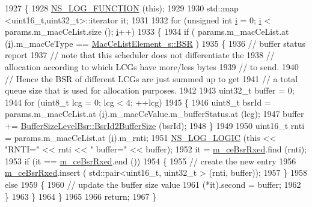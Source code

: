 \begin{DoxyCode}
1927 \{
1928   \hyperlink{log-macros-disabled_8h_a90b90d5bad1f39cb1b64923ea94c0761}{NS\_LOG\_FUNCTION} (\textcolor{keyword}{this});
1929 
1930   std::map <uint16\_t,uint32\_t>::iterator it;
1931 
1932   \textcolor{keywordflow}{for} (\textcolor{keywordtype}{unsigned} \textcolor{keywordtype}{int} \hyperlink{bernuolliDistribution_8m_a6f6ccfcf58b31cb6412107d9d5281426}{i} = 0; \hyperlink{bernuolliDistribution_8m_a6f6ccfcf58b31cb6412107d9d5281426}{i} < params.m\_macCeList.size (); \hyperlink{bernuolliDistribution_8m_a6f6ccfcf58b31cb6412107d9d5281426}{i}++)
1933     \{
1934       \textcolor{keywordflow}{if} ( params.m\_macCeList.at (\hyperlink{bernuolliDistribution_8m_a6f6ccfcf58b31cb6412107d9d5281426}{i}).m\_macCeType == \hyperlink{structns3_1_1MacCeListElement__s_a270a6526dfc7da02e9dc91823c290f6bac50796b01160b1825ec34efa1ad9f051}{MacCeListElement\_s::BSR} )
1935         \{
1936           \textcolor{comment}{// buffer status report}
1937           \textcolor{comment}{// note that this scheduler does not differentiate the}
1938           \textcolor{comment}{// allocation according to which LCGs have more/less bytes}
1939           \textcolor{comment}{// to send.}
1940           \textcolor{comment}{// Hence the BSR of different LCGs are just summed up to get}
1941           \textcolor{comment}{// a total queue size that is used for allocation purposes.}
1942 
1943           uint32\_t buffer = 0;
1944           \textcolor{keywordflow}{for} (uint8\_t lcg = 0; lcg < 4; ++lcg)
1945             \{
1946               uint8\_t bsrId = params.m\_macCeList.at (\hyperlink{bernuolliDistribution_8m_a6f6ccfcf58b31cb6412107d9d5281426}{i}).m\_macCeValue.m\_bufferStatus.at (lcg);
1947               buffer += \hyperlink{classns3_1_1BufferSizeLevelBsr_a67fc905f267ed8ac5a617fe229699122}{BufferSizeLevelBsr::BsrId2BufferSize} (bsrId);
1948             \}
1949 
1950           uint16\_t rnti = params.m\_macCeList.at (\hyperlink{bernuolliDistribution_8m_a6f6ccfcf58b31cb6412107d9d5281426}{i}).m\_rnti;
1951           \hyperlink{group__logging_ga88acd260151caf2db9c0fc84997f45ce}{NS\_LOG\_LOGIC} (\textcolor{keyword}{this} << \textcolor{stringliteral}{"RNTI="} << rnti << \textcolor{stringliteral}{" buffer="} << buffer);
1952           it = \hyperlink{classns3_1_1PfFfMacScheduler_a9d4cd2380a8e04f1e7d69ac67628b9cc}{m\_ceBsrRxed}.find (rnti);
1953           \textcolor{keywordflow}{if} (it == \hyperlink{classns3_1_1PfFfMacScheduler_a9d4cd2380a8e04f1e7d69ac67628b9cc}{m\_ceBsrRxed}.end ())
1954             \{
1955               \textcolor{comment}{// create the new entry}
1956               \hyperlink{classns3_1_1PfFfMacScheduler_a9d4cd2380a8e04f1e7d69ac67628b9cc}{m\_ceBsrRxed}.insert ( std::pair<uint16\_t, uint32\_t > (rnti, buffer));
1957             \}
1958           \textcolor{keywordflow}{else}
1959             \{
1960               \textcolor{comment}{// update the buffer size value}
1961               (*it).second = buffer;
1962             \}
1963         \}
1964     \}
1965 
1966   \textcolor{keywordflow}{return};
1967 \}
\end{DoxyCode}


